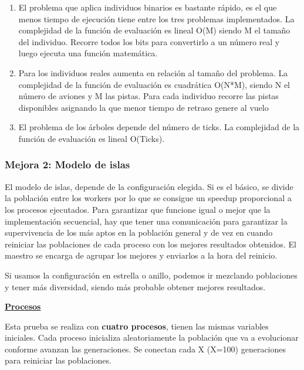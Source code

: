 		\begin{enumerate}
			\item El problema que aplica individuos binarios es bastante rápido, es el que menos tiempo de ejecución tiene entre los tres problemas implementados. La complejidad de la función de evaluación es lineal O(M) siendo M el tamaño del individuo. Recorre todos los bits para convertirlo a un número real y luego ejecuta una función matemática.
			\item Para los individuos reales aumenta en relación al tamaño del problema. La complejidad de la función de evaluación es cuadrática O(N*M), siendo N el número de aviones y M las pistas. Para cada individuo recorre las pistas disponibles asignando la que menor tiempo de retraso genere al vuelo
			\item El problema de los árboles depende del número de ticks. La complejidad de la función de evaluación es lineal O(Ticks).
		\end{enumerate}
		
	\subsubsection{Mejora 2: Modelo de islas}
		

		El modelo de islas, depende de la configuración elegida. Si es el básico, se divide la población entre los workers por lo que se consigue un speedup proporcional a los procesos ejecutados. Para garantizar que funcione igual o mejor que la implementación secuencial, hay que tener una comunicación para garantizar la supervivencia de los más aptos en la población general y de vez en cuando reiniciar las poblaciones de cada proceso con los mejores resultados obtenidos. El maestro se encarga de agrupar los mejores y enviarlos a la hora del reinicio. 
		
		Si usamos la configuración en estrella o anillo, podemos ir mezclando poblaciones y tener más diversidad, siendo más probable obtener mejores resultados.

		\begin{flushleft}			
		\begin{mdframed}[roundcorner=5pt]
			\textbf{\underline{Procesos}}
			\vspace{0.1cm}
			
			\scriptsize		
			Esta prueba se realiza con \textbf{cuatro procesos}, tienen las mismas variables iniciales. Cada proceso inicializa aleatoriamente la población que va a evolucionar conforme avanzan las generaciones. Se conectan cada X (X=100) generaciones para reiniciar las poblaciones.
		\end{mdframed}
		\end{flushleft}
		
